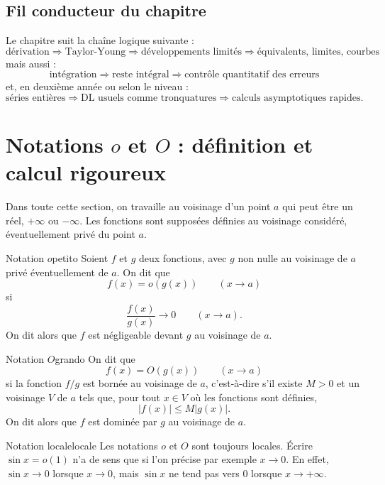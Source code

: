 \documentclass[11pt,a4paper]{article}
\begin{document}
\subsection{Fil conducteur du chapitre}

Le chapitre suit la chaîne logique suivante :
\[
\boxed{\text{dérivation}}
\Longrightarrow
\boxed{\text{Taylor-Young}}
\Longrightarrow
\boxed{\text{développements limités}}
\Longrightarrow
\boxed{\text{équivalents, limites, courbes}}
\]
mais aussi :
\[
\boxed{\text{intégration}}
\Longrightarrow
\boxed{\text{reste intégral}}
\Longrightarrow
\boxed{\text{contrôle quantitatif des erreurs}}
\]
et, en deuxième année ou selon le niveau :
\[
\boxed{\text{séries entières}}
\Longrightarrow
\boxed{\text{DL usuels comme tronquatures}}
\Longrightarrow
\boxed{\text{calculs asymptotiques rapides}}.
\]

\section{Notations $o$ et $O$ : définition et calcul rigoureux}

Dans toute cette section, on travaille au voisinage d'un point $a$ qui peut être un réel, $+\infty$ ou $-\infty$. Les fonctions sont supposées définies au voisinage considéré, éventuellement privé du point $a$.

\begin{definitionbox}{Notation $o$}{petito}
Soient $f$ et $g$ deux fonctions, avec $g$ non nulle au voisinage de $a$ privé éventuellement de $a$. On dit que
\[
  f(x)=o(g(x))\qquad(x\to a)
\]
si
\[
  \frac{f(x)}{g(x)}\longrightarrow 0\qquad(x\to a).
\]
On dit alors que $f$ est négligeable devant $g$ au voisinage de $a$.
\end{definitionbox}

\begin{definitionbox}{Notation $O$}{grando}
On dit que
\[
  f(x)=O(g(x))\qquad(x\to a)
\]
si la fonction $f/g$ est bornée au voisinage de $a$, c'est-à-dire s'il existe $M>0$ et un voisinage $V$ de $a$ tels que, pour tout $x\in V$ où les fonctions sont définies,
\[
  |f(x)|\le M|g(x)|.
\]
On dit alors que $f$ est dominée par $g$ au voisinage de $a$.
\end{definitionbox}

\begin{remarkbox}{Notation locale}{locale}
Les notations $o$ et $O$ sont toujours locales. Écrire $\sin x=o(1)$ n'a de sens que si l'on précise par exemple $x\to0$. En effet, $\sin x\to0$ lorsque $x\to0$, mais $\sin x$ ne tend pas vers $0$ lorsque $x\to+\infty$.
\end{remarkbox}
\end{document}

